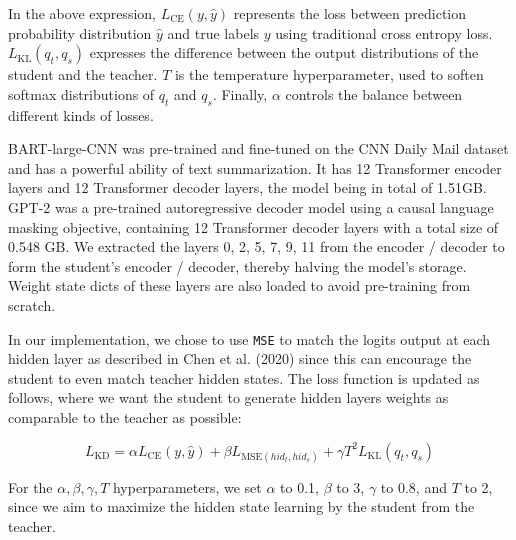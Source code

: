 \documentclass{article}
\begin{document}
    \hspace*{1em} In the above expression, $L_{\text{CE}}(y, \hat{y})$ represents the loss between prediction probability distribution $\hat{y}$ and true labels $y$ using traditional cross entropy loss. $L_{\text{KL}}(q_t, q_s)$ expresses the difference between the output distributions of the student and the teacher. $T$ is the temperature hyperparameter, used to soften softmax distributions of $q_t$ and $q_s$. Finally, $\alpha$ controls the balance between different kinds of losses.

    \hspace*{1em} BART-large-CNN\cite{lewis2020BART} was pre-trained and fine-tuned on the CNN Daily Mail dataset and has a powerful ability of text summarization. It has 12 Transformer encoder layers and 12 Transformer decoder layers, the model being in total of 1.51GB. GPT-2\cite{radford2019language} was a pre-trained autoregressive decoder model using a causal language masking objective, containing 12 Transformer decoder layers with a total size of 0.548 GB. We extracted the layers 0, 2, 5, 7, 9, 11 from the encoder / decoder to form the student's encoder / decoder, thereby halving the model's storage. Weight state dicts of these layers are also loaded to avoid pre-training from scratch.

    \hspace*{1em} In our implementation, we chose to use \texttt{MSE} to match the logits output at each hidden layer as described in Chen et al. (2020)\cite{shleifer2020distillation} since this can encourage the student to even match teacher hidden states. The loss function is updated as follows, where we want the student to generate hidden layers weights as comparable to the teacher as possible:

    \begin{equation}
        L_{\text{KD}} = \alpha L_{\text{CE}}(y, \hat{y}) + \beta L_{\text{MSE}(hid_t, hid_s)} + \gamma T^2 L_{\text{KL}}(q_t, q_s)
    \end{equation}

    \hspace*{1em} For the $\alpha, \beta, \gamma, T$ hyperparameters, we set $\alpha$ to 0.1, $\beta$ to 3, $\gamma$ to 0.8, and $T$ to 2, since we aim to maximize the hidden state learning by the student from the teacher.
\end{document}
